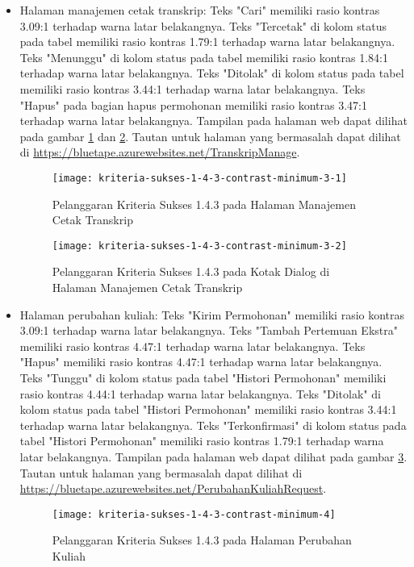 \begin{itemize}
    \item Halaman manajemen cetak transkrip: Teks "Cari" memiliki rasio kontras 3.09:1 terhadap warna latar belakangnya. Teks "Tercetak" di kolom status pada tabel memiliki rasio kontras 1.79:1 terhadap warna latar belakangnya. Teks "Menunggu" di kolom status pada tabel memiliki rasio kontras 1.84:1 terhadap warna latar belakangnya. Teks "Ditolak" di kolom status pada tabel memiliki rasio kontras 3.44:1 terhadap warna latar belakangnya. Teks "Hapus" pada bagian hapus permohonan memiliki rasio kontras 3.47:1 terhadap warna latar belakangnya. Tampilan pada halaman web dapat dilihat pada gambar \ref{fig:1.4.3_contrast_minimum_3_1} dan \ref{fig:1.4.3_contrast_minimum_3_2}. Tautan untuk halaman yang bermasalah dapat dilihat di \url{https://bluetape.azurewebsites.net/TranskripManage}.
    \begin{figure}[H]
        \centering  
        \texttt{[image: kriteria-sukses-1-4-3-contrast-minimum-3-1]}  
        \caption[Pelanggaran Kriteria Sukses 1.4.3 pada Halaman Manajemen Cetak Transkrip]{Pelanggaran Kriteria Sukses 1.4.3 pada Halaman Manajemen Cetak Transkrip}
        \label{fig:1.4.3_contrast_minimum_3_1}
    \end{figure} 
    
    \begin{figure}[H]
        \centering  
        \texttt{[image: kriteria-sukses-1-4-3-contrast-minimum-3-2]}  
        \caption[Pelanggaran Kriteria Sukses 1.4.3 pada Kotak Dialog di Halaman Manajemen Cetak Transkrip]{Pelanggaran Kriteria Sukses 1.4.3 pada Kotak Dialog di Halaman Manajemen Cetak Transkrip}
        \label{fig:1.4.3_contrast_minimum_3_2}
    \end{figure} 

    \item Halaman perubahan kuliah: Teks "Kirim Permohonan" memiliki rasio kontras 3.09:1 terhadap warna latar belakangnya. Teks "Tambah Pertemuan Ekstra" memiliki rasio kontras 4.47:1 terhadap warna latar belakangnya. Teks "Hapus" memiliki rasio kontras 4.47:1 terhadap warna latar belakangnya. Teks "Tunggu" di kolom status pada tabel "Histori Permohonan" memiliki rasio kontras 4.44:1 terhadap warna latar belakangnya. Teks "Ditolak" di kolom status pada tabel "Histori Permohonan" memiliki rasio kontras 3.44:1 terhadap warna latar belakangnya. Teks "Terkonfirmasi" di kolom status pada tabel "Histori Permohonan" memiliki rasio kontras 1.79:1 terhadap warna latar belakangnya. Tampilan pada halaman web dapat dilihat pada gambar \ref{fig:1.4.3_contrast_minimum_4}. Tautan untuk halaman yang bermasalah dapat dilihat di \url{https://bluetape.azurewebsites.net/PerubahanKuliahRequest}.
    \begin{figure}[H]
        \centering  
        \texttt{[image: kriteria-sukses-1-4-3-contrast-minimum-4]}  
        \caption[Pelanggaran Kriteria Sukses 1.4.3 pada Halaman Perubahan Kuliah]{Pelanggaran Kriteria Sukses 1.4.3 pada Halaman Perubahan Kuliah}
        \label{fig:1.4.3_contrast_minimum_4}  
    \end{figure} 
    

\end{itemize}
